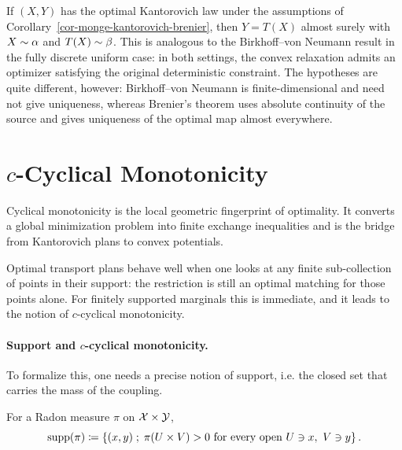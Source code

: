 \begin{rem}
	If $(X,Y)$ has the optimal Kantorovich law under the assumptions of Corollary~\ref{cor-monge-kantorovich-brenier}, then $Y=T(X)$ almost surely with $X\sim\alpha$ and $T(X)\sim\beta$. This is analogous to the Birkhoff--von Neumann result in the fully discrete uniform case: in both settings, the convex relaxation admits an optimizer satisfying the original deterministic constraint. The hypotheses are quite different, however: Birkhoff--von Neumann is finite-dimensional and need not give uniqueness, whereas Brenier's theorem uses absolute continuity of the source and gives uniqueness of the optimal map almost everywhere.
\end{rem}

\section{\texorpdfstring{$c$}{c}-Cyclical Monotonicity}
\label{sec-cyclical-monotonicity}

Cyclical monotonicity is the local geometric fingerprint of optimality. It converts a global minimization problem into finite exchange inequalities and is the bridge from Kantorovich plans to convex potentials.

Optimal transport plans behave well when one looks at any finite sub-collection of points in their support: the restriction is still an optimal matching for those points alone. For finitely supported marginals this is immediate, and it leads to the notion of $c$-cyclical monotonicity.

\paragraph{Support and $c$-cyclical monotonicity.}

To formalize this, one needs a precise notion of support, i.e. the closed set that carries the mass of the coupling.

\begin{defn}[Support]\label{def-support}
	For a Radon measure $\pi$ on $\mathcal{X}\times\mathcal{Y}$,
	\[
		\operatorname{supp}(\pi)
		\coloneqq
		\left\{ (x,y) \;;\; \pi(U\times V)>0\text{ for every open }U\ni x,\ V\ni y \right\}.
	\]
\end{defn}

